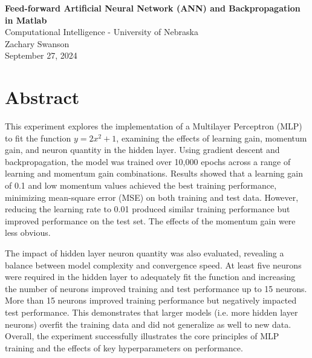\documentclass[11pt,pdftex,portrait,letterpaper]{article}
\begin{document}
\vspace*{30ex}
\begin{center}

\textbf{Feed-forward Artificial Neural Network (ANN) and Backpropagation in Matlab}\\

\vspace{4ex}
Computational Intelligence - University of Nebraska \\

\vspace{4ex}
Zachary Swanson\\
September 27, 2024\\

\end{center}


\pagebreak
\tableofcontents
\pagebreak


\section{Abstract}

This experiment explores the implementation of a Multilayer Perceptron (MLP) to fit the function $y=2x^2+1$, examining the effects of learning gain, momentum gain, and neuron quantity in the hidden layer. Using gradient descent and backpropagation, the model was trained over 10,000 epochs across a range of learning and momentum gain combinations. Results showed that a learning gain of 0.1 and low momentum values achieved the best training performance, minimizing mean-square error (MSE) on both training and test data. However, reducing the learning rate to 0.01 produced similar training performance but improved performance on the test set. The effects of the momentum gain were less obvious.

The impact of hidden layer neuron quantity was also evaluated, revealing a balance between model complexity and convergence speed. At least five neurons were required in the hidden layer to adequately fit the function and increasing the number of neurons improved training and test performance up to 15 neurons. More than 15 neurons improved training performance but negatively impacted test performance. This demonstrates that larger models (i.e. more hidden layer neurons) overfit the training data and did not generalize as well to new data. Overall, the experiment successfully illustrates the core principles of MLP training and the effects of key hyperparameters on performance.
\end{document}
